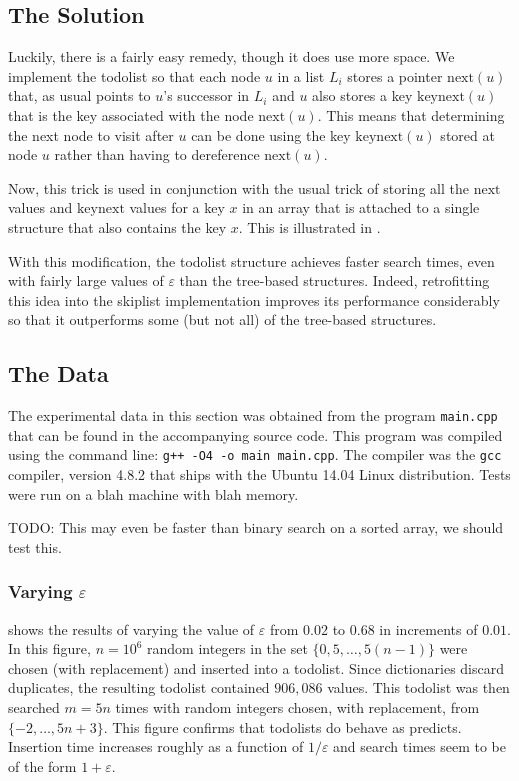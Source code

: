 \documentclass[lotsofwhite]{patmorin}
\newcommand{\eps}{\varepsilon}
\begin{document}
\subsection{The Solution}

Luckily, there is a fairly easy remedy, though it does use more space.
We implement the todolist so that each node $u$ in a list $L_i$ stores
a pointer $\mathrm{next}(u)$ that, as usual points to $u$'s successor
in $L_i$ and $u$ also stores a key $\mathrm{keynext}(u)$ that is the
key associated with the node $\mathrm{next}(u)$.  This means that
determining the next node to visit after $u$ can be done using the
key $\mathrm{keynext}(u)$ stored at node $u$ rather than having to
dereference $\mathrm{next}(u)$.

Now, this trick is used in conjunction with the usual trick of storing all
the $\mathrm{next}$ values and $\mathrm{keynext}$ values for a key $x$
in an array that is attached to a single structure that also contains
the key $x$.  This is illustrated in .

With this modification, the todolist structure achieves faster search
times, even with fairly large values of $\eps$ than the tree-based
structures. Indeed, retrofitting this idea into the skiplist
implementation improves its performance considerably so that it
outperforms some (but not all) of the tree-based structures.

\subsection{The Data}

The experimental data in this section was obtained from the program
\texttt{main.cpp} that can be found in the accompanying source code.
This program was compiled using the command line: \texttt{g++ -O4 -o
main main.cpp}. The compiler was the \texttt{gcc} compiler, version 4.8.2
that ships with the Ubuntu 14.04 Linux distribution.  Tests were run on
a blah machine with blah memory.

TODO: This may even be faster than binary search on a sorted array, we should test this.

\subsubsection{Varying $\eps$}

 shows the results of varying the value of $\eps$ from
$0.02$ to $0.68$ in increments of $0.01$. In this figure, $n=10^6$
random integers in the set $\{0, 5,\ldots,5(n-1)\}$ were chosen
(with replacement) and inserted into a todolist. Since dictionaries
discard duplicates, the resulting todolist contained $906,086$ values.
This todolist was then searched $m=5n$ times with random integers chosen,
with replacement, from $\{-2,\ldots,5n+3\}$.  This figure confirms
that todolists do behave as  predicts.  Insertion time
increases roughly as a function of $1/\eps$ and search times seem to be
of the form $1+\eps$.
\end{document}
